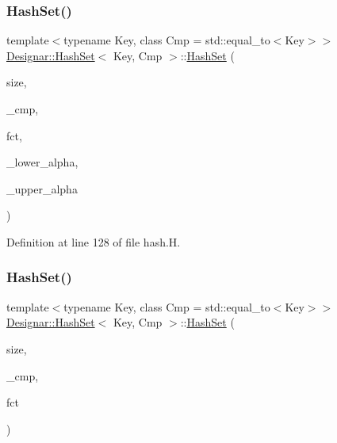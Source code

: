 \subsubsection{\texorpdfstring{Hash\+Set()}{HashSet()}\hspace{0.1cm}{\footnotesize\ttfamily [1/12]}}
{\footnotesize\ttfamily template$<$typename Key, class Cmp = std\+::equal\+\_\+to$<$\+Key$>$$>$ \\
\hyperlink{class_designar_1_1_hash_set}{Designar\+::\+Hash\+Set}$<$ Key, Cmp $>$\+::\hyperlink{class_designar_1_1_hash_set}{Hash\+Set} (\begin{DoxyParamCaption}\item[{\hyperlink{namespace_designar_aa72662848b9f4815e7bf31a7cf3e33d1}{nat\+\_\+t}}]{size,  }\item[{Cmp \&}]{\+\_\+cmp,  }\item[{\hyperlink{class_designar_1_1_hash_set_a05d8d111665c25bc17290c01fa299398}{Hash\+Fct\+Type}}]{fct,  }\item[{\hyperlink{namespace_designar_aca2c32af26808dbec1f3a3071fad25ce}{real\+\_\+t}}]{\+\_\+lower\+\_\+alpha,  }\item[{\hyperlink{namespace_designar_aca2c32af26808dbec1f3a3071fad25ce}{real\+\_\+t}}]{\+\_\+upper\+\_\+alpha }\end{DoxyParamCaption})\hspace{0.3cm}{\ttfamily [inline]}}



Definition at line 128 of file hash.\+H.

\mbox{\label{class_designar_1_1_hash_set_a6f60ca18ef5bcf8560b9827ca9678e58}} 
\subsubsection{\texorpdfstring{Hash\+Set()}{HashSet()}\hspace{0.1cm}{\footnotesize\ttfamily [2/12]}}
{\footnotesize\ttfamily template$<$typename Key, class Cmp = std\+::equal\+\_\+to$<$\+Key$>$$>$ \\
\hyperlink{class_designar_1_1_hash_set}{Designar\+::\+Hash\+Set}$<$ Key, Cmp $>$\+::\hyperlink{class_designar_1_1_hash_set}{Hash\+Set} (\begin{DoxyParamCaption}\item[{\hyperlink{namespace_designar_aa72662848b9f4815e7bf31a7cf3e33d1}{nat\+\_\+t}}]{size,  }\item[{Cmp \&}]{\+\_\+cmp,  }\item[{\hyperlink{class_designar_1_1_hash_set_a05d8d111665c25bc17290c01fa299398}{Hash\+Fct\+Type}}]{fct }\end{DoxyParamCaption})\hspace{0.3cm}{\ttfamily [inline]}}



